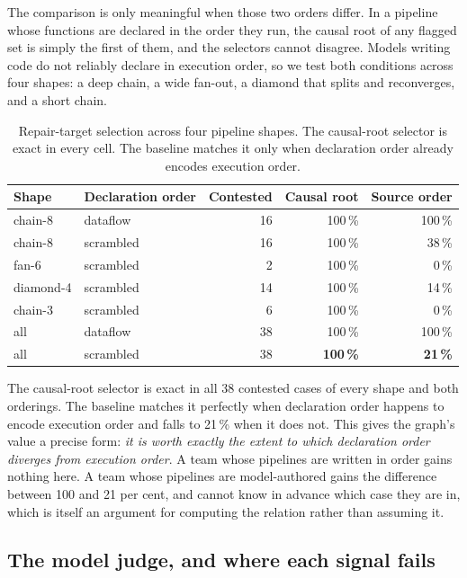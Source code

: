 The comparison is only meaningful when those two orders differ. In a pipeline whose
functions are declared in the order they run, the causal root of any flagged set is simply
the first of them, and the selectors cannot disagree. Models writing code do not reliably
declare in execution order, so we test both conditions across four shapes: a deep chain, a
wide fan-out, a diamond that splits and reconverges, and a short chain.

\begin{table}[t]
\centering
\begin{tabular}{llrrr}
\toprule
Shape & Declaration order & Contested & Causal root & Source order \\
\midrule
chain-8    & dataflow  & 16 & 100\,\% & 100\,\% \\
chain-8    & scrambled & 16 & 100\,\% & 38\,\% \\
fan-6      & scrambled &  2 & 100\,\% & 0\,\% \\
diamond-4  & scrambled & 14 & 100\,\% & 14\,\% \\
chain-3    & scrambled &  6 & 100\,\% & 0\,\% \\
\midrule
all        & dataflow  & 38 & 100\,\% & 100\,\% \\
all        & scrambled & 38 & \textbf{100\,\%} & \textbf{21\,\%} \\
\bottomrule
\end{tabular}
\caption{Repair-target selection across four pipeline shapes. The causal-root selector is
exact in every cell. The baseline matches it only when declaration order already encodes
execution order.}
\label{tab:selection}
\end{table}

The causal-root selector is exact in all 38 contested cases of every shape and both
orderings. The baseline matches it perfectly when declaration order happens to encode
execution order and falls to 21\,\% when it does not. This gives the graph's value a precise
form: \emph{it is worth exactly the extent to which declaration order diverges from
execution order}. A team whose pipelines are written in order gains nothing here. A team
whose pipelines are model-authored gains the difference between 100 and 21 per cent, and
cannot know in advance which case they are in, which is itself an argument for computing
the relation rather than assuming it.

\subsection{The model judge, and where each signal fails}
\label{sec:compute2}

